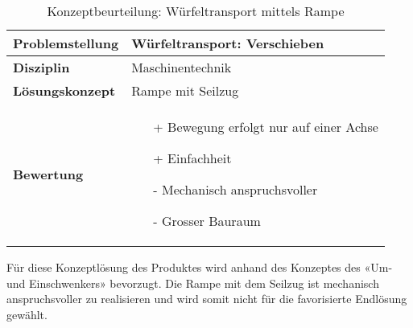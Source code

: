 \documentclass[../../main.tex]{subfiles}
\begin{document}
    \begin{flushleft}
        \begin{table}[h]
        \begin{tabular}{ | l | p{11cm} |}
        \hline
        \textbf{Problemstellung} & Würfeltransport: Verschieben \\ \hline
        \textbf{Disziplin} & Maschinentechnik \\ \hline
        \textbf{Lösungskonzept} &  Rampe mit Seilzug \\ \hline
        \textbf{Bewertung} &  \begin{itemize}
                                \item[+] Bewegung erfolgt nur auf einer Achse
                                \item[+] Einfachheit
                                \item[-] Mechanisch anspruchsvoller
                                \item[-] Grosser Bauraum
                              \end{itemize} \\ \hline
        \end{tabular}
        \caption{Konzeptbeurteilung: Würfeltransport mittels Rampe}
        \label{tab:konzept_wurfeltrransport_umschwenker}
    \end{table}
    \end{flushleft}
    Für diese Konzeptlösung des Produktes wird anhand des Konzeptes des «Um- und Einschwenkers» bevorzugt. Die Rampe mit dem Seilzug ist mechanisch anspruchsvoller zu realisieren und wird somit nicht für die favorisierte Endlösung gewählt.
    
\end{document}
